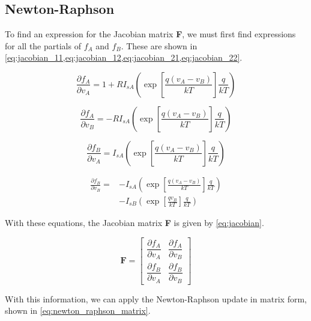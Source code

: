 \documentclass[a4paper,titlepage]{article}
\begin{document}
	\subsection{Newton-Raphson}
	
	To find an expression for the Jacobian matrix \textbf{F}, we must first find expressions for all the partials of $f_A$ and $f_B$. These are shown in \cref{eq:jacobian_11,eq:jacobian_12,eq:jacobian_21,eq:jacobian_22}.
	
	\begin{equation} \label{eq:jacobian_11}
		\frac{\partial f_A}{\partial v_A} = 1 + R I_{sA} \left( \exp\left[{\frac{q(v_A - v_B)}{kT}}\right]\frac{q}{kT}\right)
	\end{equation}
	
	\begin{equation} \label{eq:jacobian_12}
		\frac{\partial f_A}{\partial v_B} = - R I_{sA} \left( \exp\left[{\frac{q(v_A - v_B)}{kT}}\right]\frac{q}{kT}\right)
	\end{equation}
	
	\begin{equation} \label{eq:jacobian_21}
		\frac{\partial f_B}{\partial v_A} = I_{sA} \left( \exp\left[{\frac{q(v_A - v_B)}{kT}}\right]\frac{q}{kT}\right)
	\end{equation}
	
	\begin{equation} \label{eq:jacobian_22}
	\begin{split}
		\frac{\partial f_B}{\partial v_B} = &-I_{sA} \left( \exp\left[{\frac{q(v_A - v_B)}{kT}}\right]\frac{q}{kT}\right) \\
		&- I_{sB} \left( \exp\left[{\frac{qv_B}{kT}}\right]\frac{q}{kT}\right)
	\end{split}
	\end{equation}
	
	With these equations, the Jacobian matrix \textbf{F} is given by \cref{eq:jacobian}.
	
	\begin{equation} \label{eq:jacobian}
		\textbf{F} = 
		\begin{bmatrix}
		\dfrac{\partial f_A}{\partial v_A} & \dfrac{\partial f_A}{\partial v_B} \\[2ex]
		\dfrac{\partial f_B}{\partial v_A} & \dfrac{\partial f_B}{\partial v_B}
		\end{bmatrix}
	\end{equation}
	
	With this information, we can apply the Newton-Raphson update in matrix form, shown in \cref{eq:newton_raphson_matrix}.
	
\end{document}
